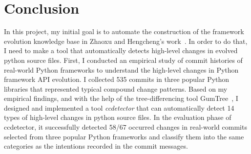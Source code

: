 \chapter{Conclusion}
\label{chap:conclusion}

In this project, my initial goal is to automate the construction of the framework evolution knowledge base in Zhaoxu and Hengcheng's work~\cite{DBLP:conf/wcre/ZhangZWTLX20}. In order to do that, I need to make a tool that automatically detects high-level changes in evolved python source files. First, I conducted an empirical study of commit histories of real-world Python frameworks to understand the high-level changes in Python framework API evolution. I collected 535 commits in three popular Python libraries that represented typical compound change patterns. Based on my empirical findings, and with the help of the tree-differencing tool GumTree~\cite{DBLP:conf/kbse/FalleriMBMM14}, I designed and implemented a tool \textit{ccdetector} that can automatically detect 14 types of high-level changes in python source files. In the evaluation phase of ccdetector, it successfully detected 58/67 occurred changes in real-world commits selected from three popular Python frameworks and classify them into the same categories as the intentions recorded in the commit messages.
